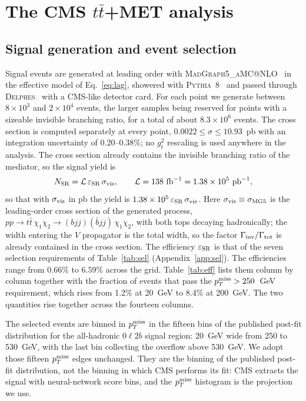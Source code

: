 \section{The CMS $t\bar t$+MET analysis}\label{sec:cms}

\subsection{Signal generation and event selection}

Signal events are generated at leading order with \textsc{MadGraph5\_aMC@NLO}~\cite{MG5} in the effective model of Eq.~\eqref{eq:lag}, showered with \textsc{Pythia}~8~\cite{PYTHIA} and passed through \textsc{Delphes}~\cite{DELPHES} with a CMS-like detector card. For each point we generate between $8\times10^3$ and $2\times10^4$ events, the larger samples being reserved for points with a sizeable invisible branching ratio, for a total of about $8.3\times10^6$ events. The cross section is computed separately at every point, $0.0022\le\sigma\le10.93$~pb with an integration uncertainty of $0.20$--$0.38\%$; no $g_t^2$ rescaling is used anywhere in the analysis. The cross section already contains the invisible branching ratio of the mediator, so the signal yield is
\begin{equation}
N_{\rm SR}=\mathcal{L}\,\varepsilon_{\rm SR}\,\sigma_{\rm vis},
\qquad
\mathcal{L}=138\ \mathrm{fb}^{-1}=1.38\times10^{5}\ \mathrm{pb}^{-1},
\label{eq:nsr}
\end{equation}
\noindent so that with $\sigma_{\rm vis}$ in pb the yield is $1.38\times10^{5}\,\varepsilon_{\rm SR}\,\sigma_{\rm vis}$. Here $\sigma_{\rm vis}\equiv\sigma_{\rm MG5}$ is the leading-order cross section of the generated process, $pp\to t\bar t\,\chi_1\chi_2\to(bjj)(\bar bjj)\,\chi_1\chi_2$, with both tops decaying hadronically; the width entering the $V$ propagator is the total width, so the factor $\Gamma_{\rm inv}/\Gamma_{\rm tot}$ is already contained in the cross section.
The efficiency $\varepsilon_{\rm SR}$ is that of the seven selection requirements of Table~\ref{tab:sel} (Appendix~\ref{app:sel}). The efficiencies range from $0.66\%$ to $6.59\%$ across the grid. Table~\ref{tab:eff} lists them column by column together with the fraction of events that pass the $p_T^{\rm miss}>250$~GeV requirement, which rises from 1.2\% at 20~GeV to 8.4\% at 200~GeV. The two quantities rise together across the fourteen columns.



The selected events are binned in $p_T^{\rm miss}$ in the fifteen bins of the published post-fit distribution for the all-hadronic $0\ell2b$ signal region: 20~GeV wide from 250 to 530~GeV, with the last bin collecting the overflow above 530~GeV. We adopt those fifteen $p_T^{\rm miss}$ edges unchanged. They are the binning of the published post-fit distribution, not the binning in which CMS performs its fit: CMS extracts the signal with neural-network score bins, and the $p_T^{\rm miss}$ histogram is the projection we use.


